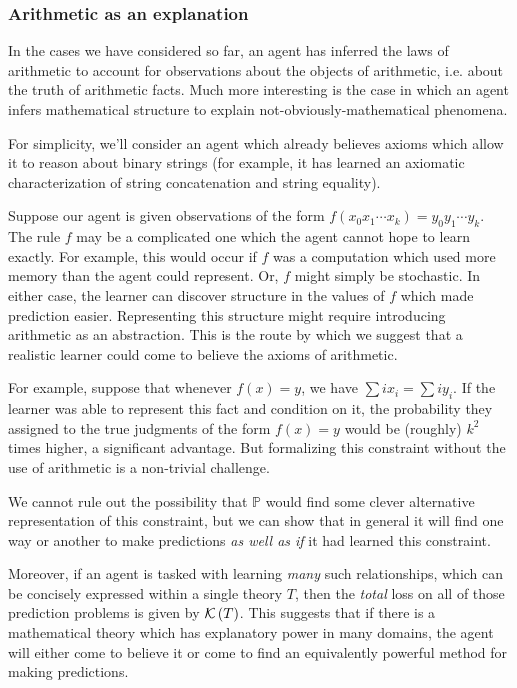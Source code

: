 \documentclass[12pt]{article}
\theoremstyle{definition}
\newcommand{\of}[1]{\left(#1\right)}
\newcommand{\PP}{\mathbb{P}}
\begin{document}
\subsubsection{Arithmetic as an explanation}

In the cases we have considered so far, an agent has inferred the laws
of arithmetic to account for observations
about the objects of arithmetic, i.e. about the truth
of arithmetic facts.
Much more interesting is the case in which an agent
infers mathematical structure to explain not-obviously-mathematical phenomena.

For simplicity, we'll consider an agent which already believes
axioms which allow it to reason about binary strings
(for example, it has learned an axiomatic characterization
of string concatenation and string equality).

Suppose our agent is given observations of the form $f\of{x_0x_1\cdots x_k} = y_0y_1 \cdots y_k$.
The rule $f$ may be a complicated one which the agent cannot hope to learn exactly.
For example, this would occur if $f$ was a computation which used more memory
than the agent could represent.
Or, $f$ might simply be stochastic.
In either case, the learner can discover structure in the values of $f$
which made prediction easier.
Representing this structure might require introducing arithmetic as an abstraction.
This is the route by which we suggest that a realistic learner could come
to believe the axioms of arithmetic.

For example, suppose that whenever $f\of{x} = y$, 
we have $\sum i x_i = \sum i y_i$.
If the learner was able to represent this fact
and condition on it, the probability they assigned
to the true judgments of the form $f\of{x} = y$
would be (roughly) $k^2$ times higher, a significant advantage.
But formalizing this constraint without the use of arithmetic is a non-trivial challenge.

We cannot rule out the possibility that $\PP$ would find some clever
alternative representation of this constraint,
but we can show that in general it will find one way or another
to make predictions \emph{as well as if} it had learned this constraint.

Moreover, if an agent is tasked with learning \emph{many} such relationships,
which can be concisely expressed within a single theory $T$,
then the \emph{total} loss on all of those prediction problems is given
by $\k{T}$.
This suggests that if there is a mathematical theory which has
explanatory power in many domains,
the agent will either come to believe it
or come to find an equivalently powerful
method for making predictions.
\end{document}
